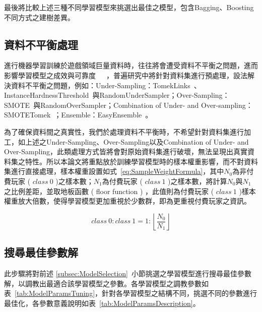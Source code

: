最後將比較上述三種不同學習模型來挑選出最佳之模型，包含Bagging、Boosting不同方式之建樹差異。

\subsection{資料不平衡處理}
\label{subsec:ImbalancedDataHandle}

進行機器學習訓練於遊戲領域巨量資料時，往往將會遭受資料不平衡之問題，進而影響學習模型之成效與可靠度~\cite{lee2016predicting}~\cite{sifa2015predicting}~\cite{chawla2009data}，普遍研究中將針對資料集進行預處理，設法解決資料不平衡之問題，例如：Under-Sampling：TomekLinks~\cite{4309452}、InstanceHardnessThreshold~\cite{smith2014instance}與RandomUnderSampler；Over-Sampling：SMOTE~\cite{chawla2002smote}與RandomOverSampler；Combination of Under- and Over-sampling：SMOTETomek~\cite{batista2003balancing}；Ensemble：EasyEnsemble~\cite{liu2008exploratory}。

為了確保資料間之真實性，我們於處理資料不平衡時，不希望針對資料集進行加工，如上述之Under-Sampling、Over-Sampling以及Combination of Under- and Over-Sampling，此類處理方式皆將會對原始資料集進行破壞，無法呈現出真實資料集之特性。所以本論文將重點放於訓練學習模型時的樣本權重影響，而不對資料集進行直接處理，樣本權重設置如式~\ref{eq:SampleWeightFormula}，其中$N_0$為非付費玩家 ( $class\ 0$ )之樣本數；$N_1$為付費玩家 ( $class\ 1$ )之樣本數，將計算$N_0$與$N_1$之比例差距，並取地板函數 ( floor function ) ，此值則為付費玩家 ( $class\ 1$ )樣本權重放大倍數，使得學習模型更加重視於少數群，即為更重視付費玩家之資訊。

\begin{equation}
  \label{eq:SampleWeightFormula}
  class\ 0 : class\ 1 = 1 : \left \lfloor{\frac{N_0}{N_1}}\right \rfloor
\end{equation}
\newpage

\subsection{搜尋最佳參數解}
\label{subsec:TuningBestParams}

此步驟將對前述 \ref{subsec:ModelSelection}~小節挑選之學習模型進行搜尋最佳參數解，以調教出最適合該學習模型之參數。各學習模型之調教參數如表~\ref{tab:ModelParamsTuning}，針對各學習模型之結構不同，挑選不同的參數進行最佳化，各參數意義說明如表~\ref{tab:ModelParamsDescription}。

